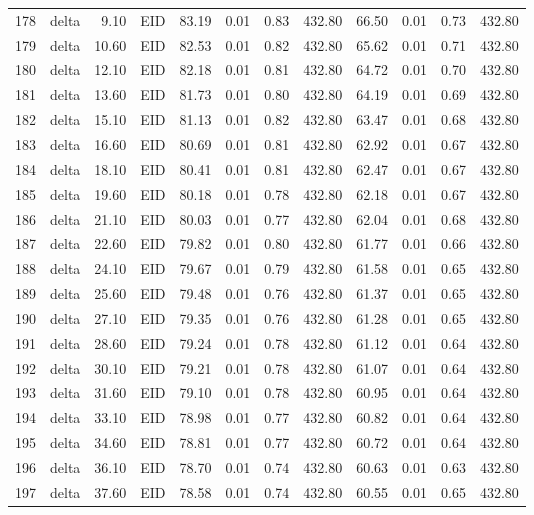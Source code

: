 \begin{table}[ht]
\begin{tabular}{rlrlrrrrrrrr}
  178 & delta & 9.10 & EID & 83.19 & 0.01 & 0.83 & 432.80 & 66.50 & 0.01 & 0.73 & 432.80 \\ 
  179 & delta & 10.60 & EID & 82.53 & 0.01 & 0.82 & 432.80 & 65.62 & 0.01 & 0.71 & 432.80 \\ 
  180 & delta & 12.10 & EID & 82.18 & 0.01 & 0.81 & 432.80 & 64.72 & 0.01 & 0.70 & 432.80 \\ 
  181 & delta & 13.60 & EID & 81.73 & 0.01 & 0.80 & 432.80 & 64.19 & 0.01 & 0.69 & 432.80 \\ 
  182 & delta & 15.10 & EID & 81.13 & 0.01 & 0.82 & 432.80 & 63.47 & 0.01 & 0.68 & 432.80 \\ 
  183 & delta & 16.60 & EID & 80.69 & 0.01 & 0.81 & 432.80 & 62.92 & 0.01 & 0.67 & 432.80 \\ 
  184 & delta & 18.10 & EID & 80.41 & 0.01 & 0.81 & 432.80 & 62.47 & 0.01 & 0.67 & 432.80 \\ 
  185 & delta & 19.60 & EID & 80.18 & 0.01 & 0.78 & 432.80 & 62.18 & 0.01 & 0.67 & 432.80 \\ 
  186 & delta & 21.10 & EID & 80.03 & 0.01 & 0.77 & 432.80 & 62.04 & 0.01 & 0.68 & 432.80 \\ 
  187 & delta & 22.60 & EID & 79.82 & 0.01 & 0.80 & 432.80 & 61.77 & 0.01 & 0.66 & 432.80 \\ 
  188 & delta & 24.10 & EID & 79.67 & 0.01 & 0.79 & 432.80 & 61.58 & 0.01 & 0.65 & 432.80 \\ 
  189 & delta & 25.60 & EID & 79.48 & 0.01 & 0.76 & 432.80 & 61.37 & 0.01 & 0.65 & 432.80 \\ 
  190 & delta & 27.10 & EID & 79.35 & 0.01 & 0.76 & 432.80 & 61.28 & 0.01 & 0.65 & 432.80 \\ 
  191 & delta & 28.60 & EID & 79.24 & 0.01 & 0.78 & 432.80 & 61.12 & 0.01 & 0.64 & 432.80 \\ 
  192 & delta & 30.10 & EID & 79.21 & 0.01 & 0.78 & 432.80 & 61.07 & 0.01 & 0.64 & 432.80 \\ 
  193 & delta & 31.60 & EID & 79.10 & 0.01 & 0.78 & 432.80 & 60.95 & 0.01 & 0.64 & 432.80 \\ 
  194 & delta & 33.10 & EID & 78.98 & 0.01 & 0.77 & 432.80 & 60.82 & 0.01 & 0.64 & 432.80 \\ 
  195 & delta & 34.60 & EID & 78.81 & 0.01 & 0.77 & 432.80 & 60.72 & 0.01 & 0.64 & 432.80 \\ 
  196 & delta & 36.10 & EID & 78.70 & 0.01 & 0.74 & 432.80 & 60.63 & 0.01 & 0.63 & 432.80 \\ 
  197 & delta & 37.60 & EID & 78.58 & 0.01 & 0.74 & 432.80 & 60.55 & 0.01 & 0.65 & 432.80 \\ 

\end{tabular}
\end{table}
